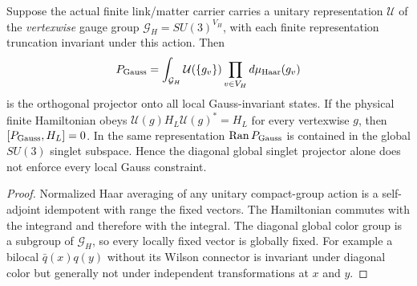 \documentclass[12pt,a4paper]{article}
\begin{document}
\begin{theorem}
\label{p10:thm:v350-local-gauss-projector}
Suppose the actual finite link/matter carrier carries a unitary
representation $\mathcal U$ of the \emph{vertexwise} gauge group
$\mathcal G_H=SU(3)^{V_H}$, with each finite representation truncation
invariant under this action. Then
\begin{equation}
\label{p10:eq:v350-local-gauss-projection}
 P_{\rm Gauss}=\int_{\mathcal G_H}\mathcal U(\{g_v\})
                  \prod_{v\in V_H}d\mu_{\rm Haar}(g_v)
\end{equation}
is the orthogonal projector onto all local Gauss-invariant states.
If the physical finite Hamiltonian obeys
$\mathcal U(g)H_L\mathcal U(g)^*=H_L$ for every vertexwise $g$,
then $[P_{\rm Gauss},H_L]=0$. In the same representation
$\operatorname{Ran}P_{\rm Gauss}$ is contained in the global
$SU(3)$ singlet subspace. Hence the diagonal global singlet
projector alone does not enforce every local Gauss constraint.
\end{theorem}
\begin{proof}
Normalized Haar averaging of any unitary compact-group action
is a self-adjoint idempotent with range the fixed vectors.
The Hamiltonian commutes with the integrand and therefore with
the integral. The diagonal global color group is a subgroup of
$\mathcal G_H$, so every locally fixed vector is globally fixed.
For example a bilocal $\bar q(x)q(y)$ without its Wilson connector
is invariant under diagonal color but generally not under
independent transformations at $x$ and $y$.
\end{proof}
\end{document}
